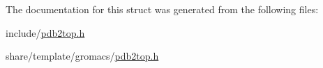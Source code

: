 \-The documentation for this struct was generated from the following files\-:\begin{DoxyCompactItemize}
\item 
include/\hyperlink{include_2pdb2top_8h}{pdb2top.\-h}\item 
share/template/gromacs/\hyperlink{share_2template_2gromacs_2pdb2top_8h}{pdb2top.\-h}\end{DoxyCompactItemize}
